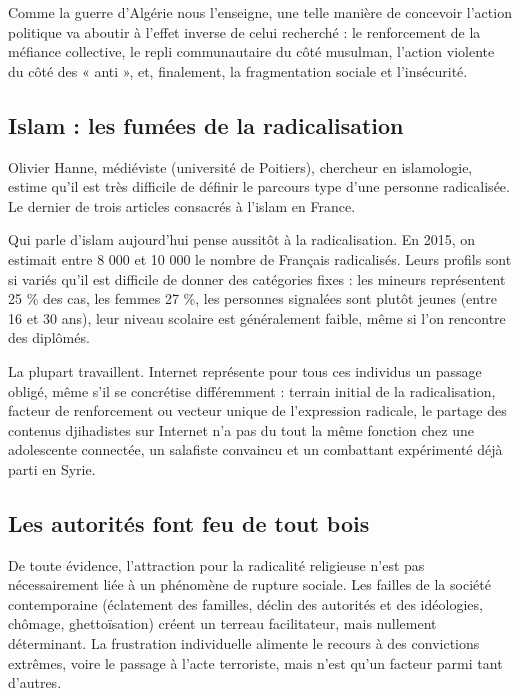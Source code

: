 Comme la guerre d'Algérie nous l'enseigne, une telle manière de
concevoir l'action politique va aboutir à l'effet inverse de celui
recherché : le renforcement de la méfiance collective, le repli
communautaire du côté musulman, l'action violente du côté des « anti »,
et, finalement, la fragmentation sociale et l'insécurité.

\subsection{Islam : les fumées de la radicalisation}

Olivier Hanne, médiéviste (université de Poitiers), chercheur en
islamologie, estime qu'il est très difficile de définir le parcours type
d'une personne radicalisée. Le dernier de trois articles consacrés à
l'islam en France. 
 

Qui parle d'islam aujourd'hui pense aussitôt à la radicalisation. En
2015, on estimait entre 8 000 et 10 000 le nombre de Français
radicalisés. Leurs profils sont si variés qu'il est difficile de donner
des catégories fixes : les mineurs représentent 25 \% des cas, les
femmes 27 \%, les personnes signalées sont plutôt jeunes (entre 16 et 30
ans), leur niveau scolaire est généralement faible, même si l'on
rencontre des diplômés.

La plupart travaillent. Internet représente pour tous ces individus un
passage obligé, même s'il se concrétise différemment : terrain initial
de la radicalisation, facteur de renforcement ou vecteur unique de
l'expression radicale, le partage des contenus djihadistes sur Internet
n'a pas du tout la même fonction chez une adolescente connectée, un
salafiste convaincu et un combattant expérimenté déjà parti en Syrie.

\subsection{Les autorités font feu de tout bois}

De toute évidence, l'attraction pour la radicalité religieuse n'est pas
nécessairement liée à un phénomène de rupture sociale. Les failles de la
société contemporaine (éclatement des familles, déclin des autorités et
des idéologies, chômage, ghettoïsation) créent un terreau facilitateur,
mais nullement déterminant. La frustration individuelle alimente le
recours à des convictions extrêmes, voire le passage à l'acte
terroriste, mais n'est qu'un facteur parmi tant d'autres.

